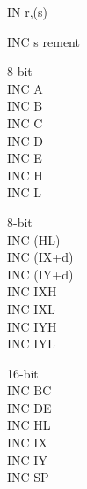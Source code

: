 \begin{basedescript}{
    \desclabelstyle{\multilinelabel}
    \desclabelwidth{3cm}}
\begin{DetailItem}{IN r,(s)}
        \begin{DetailEffects}[p]
            \FlagsINrc[\tt IN r,(C)]
            \FlagsINan[{\tt IN A,(n)} (no effect)]
        \end{DetailEffects}
						
        \begin{DetailTiming}
        \end{DetailTiming}



    \end{DetailItem}

    \pagebreak
    \begin{DetailItem}{INC s}
        {rement}
        {}

        \begin{DetailVariants}
            \textnormal{8-bit}\\
            INC A\\
            INC B\\
            INC C\\
            INC D\\
            INC E\\
            INC H\\
            INC L

            \textnormal{8-bit}\\
            INC (HL)\\
            INC (IX+d)\\
            INC (IY+d)\\
            INC IXH\UNDOC\\
            INC IXL\UNDOC\\
            INC IYH\UNDOC\\
            INC IYL\UNDOC

            \textnormal{16-bit}\\
            INC BC\\
            INC DE\\
            INC HL\\
            INC IX\\
            INC IY\\
            INC SP
        \end{DetailVariants}


\end{DetailItem}
\end{basedescript}
